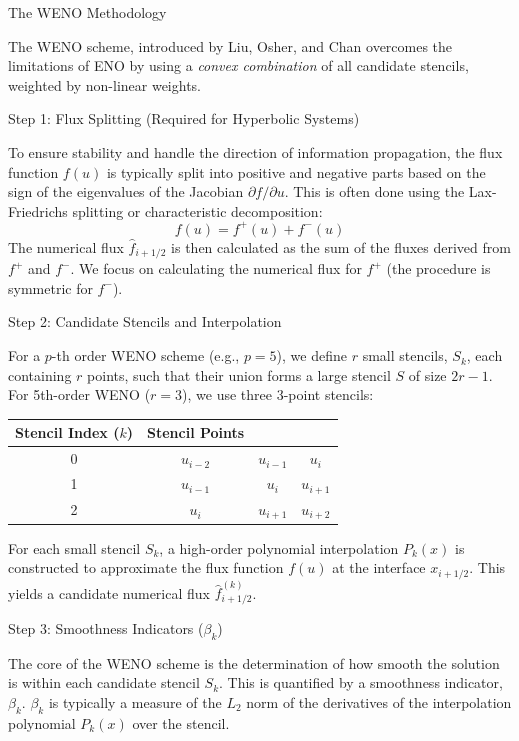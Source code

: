 \documentclass[12pt,a4paper]{article}
\begin{document}
\begin{description}
\begin{description}
\end{description}
\item The WENO Methodology

The WENO scheme, introduced by Liu, Osher, and Chan \cite{weno-l} overcomes the limitations of ENO by using a \textit{convex combination} of all candidate stencils, weighted by non-linear weights.

\begin{description}

\item  Step 1: Flux Splitting (Required for Hyperbolic Systems)

To ensure stability and handle the direction of information propagation, the flux function $f(u)$ is typically split into positive and negative parts based on the sign of the eigenvalues of the Jacobian $\partial f / \partial u$. This is often done using the Lax-Friedrichs splitting or characteristic decomposition:
$$f(u) = f^+(u) + f^-(u)$$
The numerical flux $\hat{f}_{i+1/2}$ is then calculated as the sum of the fluxes derived from $f^+$ and $f^-$. We focus on calculating the numerical flux for $f^+$ (the procedure is symmetric for $f^-$).

\item Step 2: Candidate Stencils and Interpolation

For a $p$-th order WENO scheme (e.g., $p=5$), we define $r$ small stencils, $S_k$, each containing $r$ points, such that their union forms a large stencil $S$ of size $2r-1$. For 5th-order WENO ($r=3$), we use three 3-point stencils:

\begin{tabular}{|c|c|c|c|}
\hline
	Stencil Index ($k$) & Stencil Points & &\\
	\hline
	0 &  $u_{i-2}$& $u_{i-1}$& $u_i$ \\
	\hline 
	1 & 	$u_{i-1}$ & $ u_i$& $u_{i+1}$ \\
	\hline
	2 & $u_i$ &$u_{i+1}$ & $ u_{i+2}$ \\
	\hline 
\end{tabular}

For each small stencil $S_k$, a high-order polynomial interpolation $P_k(x)$ is constructed to approximate the flux function $f(u)$ at the interface $x_{i+1/2}$. This yields a candidate numerical flux $\hat{f}_{i+1/2}^{(k)}$.

\item Step 3: Smoothness Indicators ($\beta_k$)

The core of the WENO scheme is the determination of how smooth the solution is within each candidate stencil $S_k$. This is quantified by a smoothness indicator, $\beta_k$. $\beta_k$ is typically a measure of the $L_2$ norm of the derivatives of the interpolation polynomial $P_k(x)$ over the stencil.


\end{description}
\end{description}
\end{document}
